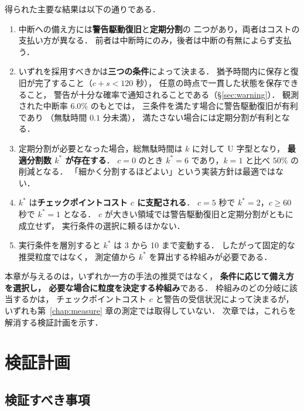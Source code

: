 \documentclass[11pt,a4paper]{ltjsreport}
\begin{document}
得られた主要な結果は以下の通りである．

\begin{enumerate}
  \item 中断への備え方には\textbf{警告駆動復旧}と\textbf{定期分割}の
        二つがあり，両者はコストの支払い方が異なる．
        前者は中断時にのみ，後者は中断の有無によらず支払う．
  \item いずれを採用すべきかは\textbf{三つの条件}によって決まる．
        猶予時間内に保存と復旧が完了すること（$c + s < 120$ 秒），
        任意の時点で一貫した状態を保存できること，
        警告が十分な確率で通知されることである（\S\ref{sec:warning}）．
        観測された中断率 $6.0\%$ のもとでは，
        三条件を満たす場合に警告駆動復旧が有利であり
        （無駄時間 $0.1$ 分未満），
        満たさない場合には定期分割が有利となる．
  \item 定期分割が必要となった場合，総無駄時間は $k$ に対して U 字型となり，
        \textbf{最適分割数 $k^{*}$ が存在する}．
        $c=0$ のとき $k^{*}=6$ であり，$k=1$ と比べ $50\%$ の削減となる．
        「細かく分割するほどよい」という実装方針は最適ではない．
  \item $k^{*}$ は\textbf{チェックポイントコスト $c$ に支配される}．
        $c=5$ 秒で $k^{*}=2$，$c \geq 60$ 秒で $k^{*}=1$ となる．
        $c$ が大きい領域では警告駆動復旧と定期分割がともに成立せず，
        実行条件の選択に頼るほかない．
  \item 実行条件を層別すると $k^{*}$ は 3 から 10 まで変動する．
        したがって固定的な推奨粒度ではなく，
        測定値から $k^{*}$ を算出する枠組みが必要である．
\end{enumerate}

本章が与えるのは，いずれか一方の手法の推奨ではなく，
\textbf{条件に応じて備え方を選択し，
必要な場合に粒度を決定する枠組み}である．
枠組みのどの分岐に該当するかは，
チェックポイントコスト $c$ と警告の受信状況によって決まるが，
いずれも第~\ref{chap:measure} 章の測定では取得していない．
次章では，これらを解消する検証計画を示す．

\chapter{検証計画}
\label{chap:plan}

\section{検証すべき事項}
\end{document}
